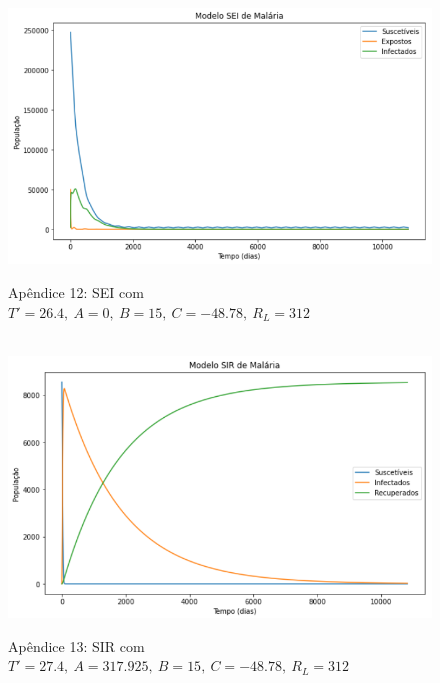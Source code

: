 \documentclass[12pt]{article}
\begin{document}
\begin{figure}[!ht]
        \centering
        \hbox{\hspace{3.5em} \includegraphics[scale=0.6] {SEI_Correcao_max_A0.png}}
        \caption*{Apêndice 12: SEI com $T'=26.4, \ A=0, \ B=15, \ C=-48.78, \ R_L=312$}
\end{figure}
\newpage
\begin{figure}[!ht]
        \centering
        \hbox{\hspace{4.0em} \includegraphics[scale=0.6] {SIR_Correcao_max_T_linha.png}}
        \caption*{Apêndice 13: SIR com $T'=27.4, \ A=317.925, \ B=15, \ C=-48.78, \ R_L=312$}
\end{figure} 
\end{document}
